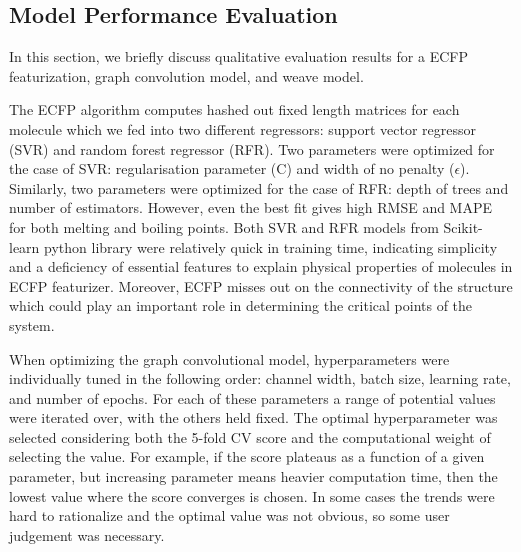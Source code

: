 \documentclass[book.tex]{subfiles}
\begin{document}
\subsection{Model Performance Evaluation}

In this section, we briefly discuss qualitative evaluation results for a ECFP featurization, graph convolution model, and weave model.

The ECFP algorithm computes hashed out fixed length matrices for each molecule which we fed into two different regressors: support vector regressor (SVR) and random forest regressor (RFR). Two parameters were optimized for the case of SVR: regularisation parameter (C) and width of no penalty ($\epsilon$). Similarly, two parameters were optimized for the case of RFR: depth of trees and number of estimators. However, even the best fit gives high RMSE and MAPE for both melting and boiling points. Both SVR and RFR models from Scikit-learn python library were relatively quick in training time, indicating simplicity and a deficiency of essential features to explain physical properties of molecules in ECFP featurizer. Moreover, ECFP misses out on the connectivity of the structure which could play an important role in determining the critical points of the system.


When optimizing the graph convolutional model, hyperparameters were individually tuned in the following order: channel width, batch size, learning rate, and number of epochs. For each of these parameters a range of potential values were iterated over, with the others held fixed. The optimal hyperparameter was selected considering both the 5-fold CV score and the computational weight of selecting the value. For example, if the score plateaus as a function of a given parameter, but increasing parameter means heavier computation time, then the lowest value where the score converges is chosen. In some cases the trends were hard to rationalize and the optimal value was not obvious, so some user judgement was necessary. %
\end{document}
